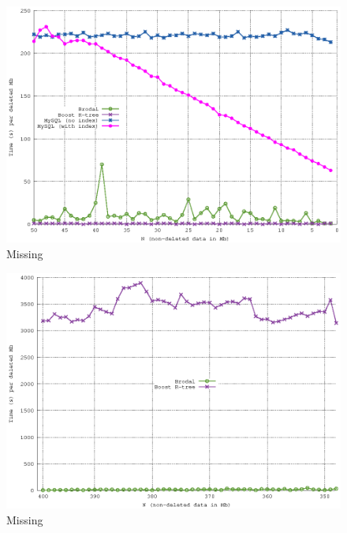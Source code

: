 \documentclass[twoside,11pt,openright]{report}
\begin{document}
\begin{figure}[htp!]
\includegraphics[width=\textwidth]{../src/experiments/delete_experiment_results/2016-05-27.10_10_14/time4}
\caption{Missing}
\label{fig:delete_complexity_result}
\end{figure}

\begin{figure}[htp!]
\includegraphics[width=\textwidth]{../src/experiments/delete_experiment_results/2016-05-31.08_55_51/time2}
\caption{Missing}
\label{fig:delete_complexity_result}
\end{figure}
\end{document}
